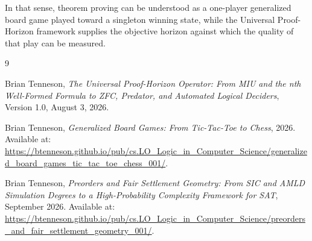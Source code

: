 \documentclass[11pt]{article}
\begin{document}
In that sense, theorem proving can be understood as a one-player generalized
board game played toward a singleton winning state, while the Universal
Proof-Horizon framework \cite{tenneson-uph} supplies the objective horizon against which the
quality of that play can be measured.

\begin{thebibliography}{9}

Brian Tenneson,
\emph{The Universal Proof-Horizon Operator: From MIU and the nth Well-Formed
Formula to ZFC, Predator, and Automated Logical Deciders},
Version 1.0, August 3, 2026.

Brian Tenneson,
\emph{Generalized Board Games: From Tic-Tac-Toe to Chess},
2026.
Available at:
\url{https://btenneson.github.io/pub/cs.LO_Logic_in_Computer_Science/generalized_board_games_tic_tac_toe_chess_001/}.


Brian Tenneson,
\emph{Preorders and Fair Settlement Geometry: From SIC and AMLD Simulation
Degrees to a High-Probability Complexity Framework for SAT},
September 2026.
Available at:
\url{https://btenneson.github.io/pub/cs.LO_Logic_in_Computer_Science/preorders_and_fair_settlement_geometry_001/}.

\end{thebibliography}
\end{document}

